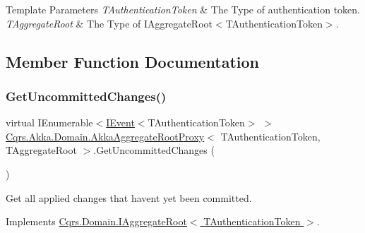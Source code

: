 \begin{DoxyTemplParams}{Template Parameters}
{\em T\+Authentication\+Token} & The Type of authentication token.\\
\hline
{\em T\+Aggregate\+Root} & The Type of I\+Aggregate\+Root$<$\+T\+Authentication\+Token$>$.\\
\hline
\end{DoxyTemplParams}


\subsection{Member Function Documentation}
\mbox{\label{classCqrs_1_1Akka_1_1Domain_1_1AkkaAggregateRootProxy_afa620ced4762b0539da23ca063fed489_afa620ced4762b0539da23ca063fed489}} 
\subsubsection{\texorpdfstring{Get\+Uncommitted\+Changes()}{GetUncommittedChanges()}}
{\footnotesize\ttfamily virtual I\+Enumerable$<$\hyperlink{interfaceCqrs_1_1Events_1_1IEvent}{I\+Event}$<$T\+Authentication\+Token$>$ $>$ \hyperlink{classCqrs_1_1Akka_1_1Domain_1_1AkkaAggregateRootProxy}{Cqrs.\+Akka.\+Domain.\+Akka\+Aggregate\+Root\+Proxy}$<$ T\+Authentication\+Token, T\+Aggregate\+Root $>$.Get\+Uncommitted\+Changes (\begin{DoxyParamCaption}{ }\end{DoxyParamCaption})\hspace{0.3cm}{\ttfamily [virtual]}}



Get all applied changes that haven\textquotesingle{}t yet been committed. 



Implements \hyperlink{interfaceCqrs_1_1Domain_1_1IAggregateRoot_a22fda414613f5ac0d4371554d7d6473b_a22fda414613f5ac0d4371554d7d6473b}{Cqrs.\+Domain.\+I\+Aggregate\+Root$<$ T\+Authentication\+Token $>$}.

\mbox{\label{classCqrs_1_1Akka_1_1Domain_1_1AkkaAggregateRootProxy_ae611077a51a215aef7fd0e106734b386_ae611077a51a215aef7fd0e106734b386}} 
